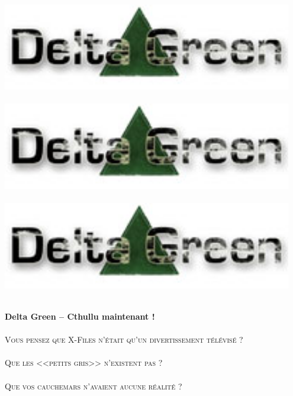 \documentclass[40pt,twoside,a4paper]{article}
\def\confidentialDGTIKZ{%
	\begin{tikzpicture}[remember picture,overlay]
	\node[rotate=60,scale=7.5,text opacity=0.2] at (current page.center) {Confidential -- Delta Green};
	\end{tikzpicture}
}%
\begin{document}
\setlength\parindent{0pt}


~\\

\begin{minipage}[ht]{0.30\textwidth}
	\includegraphics[width=0.95\textwidth]{img/logo_DG.jpg} ~\\~\\
	\includegraphics[width=0.95\textwidth]{img/logo_DG.jpg} ~\\~\\
	\includegraphics[width=0.95\textwidth]{img/logo_DG.jpg} ~\\~\\
\end{minipage} \hfill \begin{minipage}[ht]{0.65\textwidth}
	\textbf{\huge Delta Green -- Cthullu maintenant !} ~\\~\\
	\textsc{\LARGE Vous pensez que X-Files n'{\'e}tait qu'un divertissement t{\'e}l{\'e}vis{\'e} ?}~\\~\\
	\textsc{\LARGE Que les <<petits gris>>  n'existent pas ?}~\\~\\
	\textsc{\LARGE Que vos cauchemars n'avaient aucune r{\'e}alit{\'e} ?}~\\~\\
	

\end{minipage}
\end{document}
